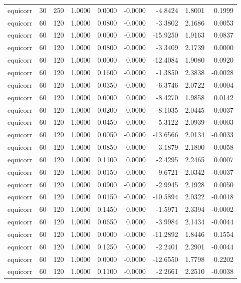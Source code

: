 \begin{tabular}{lrrrrrrrr}
equicorr & 30 & 250 & 1.0000 & 0.0000 & -0.0000 & -4.8424 & 1.8001 & 0.1999 \\
equicorr & 60 & 120 & 1.0000 & 0.0800 & -0.0000 & -3.3802 & 2.1686 & 0.0053 \\
equicorr & 60 & 120 & 1.0000 & 0.0000 & -0.0000 & -15.9250 & 1.9163 & 0.0837 \\
equicorr & 60 & 120 & 1.0000 & 0.0800 & -0.0000 & -3.3409 & 2.1739 & 0.0000 \\
equicorr & 60 & 120 & 1.0000 & 0.0000 & 0.0000 & -12.4084 & 1.9080 & 0.0920 \\
equicorr & 60 & 120 & 1.0000 & 0.1600 & -0.0000 & -1.3850 & 2.3838 & -0.0028 \\
equicorr & 60 & 120 & 1.0000 & 0.0350 & -0.0000 & -6.3746 & 2.0722 & 0.0004 \\
equicorr & 60 & 120 & 1.0000 & 0.0000 & 0.0000 & -8.4270 & 1.9858 & 0.0142 \\
equicorr & 60 & 120 & 1.0000 & 0.0200 & 0.0000 & -8.1035 & 2.0445 & -0.0037 \\
equicorr & 60 & 120 & 1.0000 & 0.0450 & -0.0000 & -5.3122 & 2.0939 & 0.0003 \\
equicorr & 60 & 120 & 1.0000 & 0.0050 & -0.0000 & -13.6566 & 2.0134 & -0.0033 \\
equicorr & 60 & 120 & 1.0000 & 0.0850 & 0.0000 & -3.1879 & 2.1800 & 0.0058 \\
equicorr & 60 & 120 & 1.0000 & 0.1100 & 0.0000 & -2.4295 & 2.2465 & 0.0007 \\
equicorr & 60 & 120 & 1.0000 & 0.0150 & -0.0000 & -9.6721 & 2.0342 & -0.0037 \\
equicorr & 60 & 120 & 1.0000 & 0.0900 & -0.0000 & -2.9945 & 2.1928 & 0.0050 \\
equicorr & 60 & 120 & 1.0000 & 0.0150 & -0.0000 & -10.5894 & 2.0322 & -0.0018 \\
equicorr & 60 & 120 & 1.0000 & 0.1450 & 0.0000 & -1.5971 & 2.3394 & -0.0002 \\
equicorr & 60 & 120 & 1.0000 & 0.0650 & 0.0000 & -3.9984 & 2.1434 & -0.0044 \\
equicorr & 60 & 120 & 1.0000 & 0.0000 & -0.0000 & -11.2892 & 1.8446 & 0.1554 \\
equicorr & 60 & 120 & 1.0000 & 0.1250 & 0.0000 & -2.2401 & 2.2901 & -0.0044 \\
equicorr & 60 & 120 & 1.0000 & 0.0000 & -0.0000 & -12.6550 & 1.7798 & 0.2202 \\
equicorr & 60 & 120 & 1.0000 & 0.1100 & -0.0000 & -2.2661 & 2.2510 & -0.0038 \\

\end{tabular}
